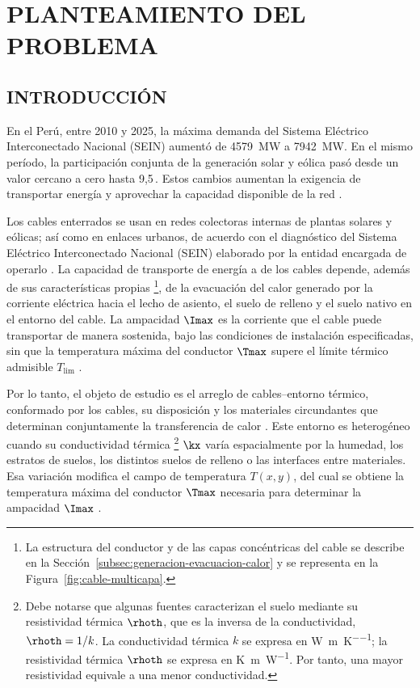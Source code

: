 \chapter{PLANTEAMIENTO DEL PROBLEMA}
\thispagestyle{empty}

\section{INTRODUCCIÓN}
\label{sec:diagnostico}

En el Perú, entre 2010 y 2025, la máxima demanda del Sistema Eléctrico Interconectado Nacional (SEIN) aumentó de \SI{4579}{\mega\watt} a \SI{7942}{\mega\watt}. En el mismo período, la participación conjunta de la generación solar y eólica pasó desde un valor cercano a cero hasta 9,5\,\pct{}. Estos cambios aumentan la exigencia de transportar energía y aprovechar la capacidad disponible de la red \parencites{minem2025anuario2024}{minem2025indicadoresDiciembre}{coesMaximaDemanda}{iea2025transmissiongrid}.

Los cables enterrados se usan en redes colectoras internas de plantas solares y eólicas; así como en enlaces urbanos, de acuerdo con el diagnóstico del Sistema Eléctrico Interconectado Nacional (SEIN) elaborado por la entidad encargada de operarlo \parencites{coes2021puntaLomitasEO}{coes2022planTransmision2023_2032}{proinversion2026palian}. La capacidad de transporte de energía a de los cables depende, además de sus características propias \footnote{La estructura del conductor y de las capas concéntricas del cable se describe en la Sección~\ref{subsec:generacion-evacuacion-calor} y se representa en la Figura~\ref{fig:cable-multicapa}.}, de la evacuación del calor generado por la corriente eléctrica hacia el lecho de asiento, el suelo de relleno y el suelo nativo en el entorno del cable. La ampacidad \(\Imax\) es la corriente que el cable puede transportar de manera sostenida, bajo las condiciones de instalación especificadas, sin que la temperatura máxima del conductor \(\Tmax\) supere el límite térmico admisible \(T_{\mathrm{lim}}\) \parencites[cláusulas~4--5]{iec60287}[3--5]{enescu2020}.

Por lo tanto, el objeto de estudio es el arreglo de cables--entorno térmico, conformado por los cables, su disposición y los materiales circundantes que determinan conjuntamente la transferencia de calor \parencites[1--3]{enescu2020}[41--42]{cigre2025}. Este entorno es heterogéneo cuando su conductividad térmica \footnote{Debe notarse que algunas fuentes caracterizan el suelo mediante su resistividad térmica \(\rhoth\), que es la inversa de la conductividad, \(\rhoth=1/k\). La conductividad térmica $k$ se expresa en \si{\watt\per\metre\per\kelvin}; la resistividad térmica $\rhoth$ se expresa en \si{\kelvin\metre\per\watt}. Por tanto, una mayor resistividad equivale a una menor conductividad.} \(\kx\) varía espacialmente por la humedad, los estratos de suelos, los distintos suelos de relleno o las interfaces entre materiales. Esa variación modifica el campo de temperatura \(T(x,y)\), del cual se obtiene la temperatura máxima del conductor \(\Tmax\) necesaria para determinar la ampacidad \(\Imax\) \parencites[3--4]{enescu2021}[1,6--7]{khumalo2025}[3]{xing2023}.

